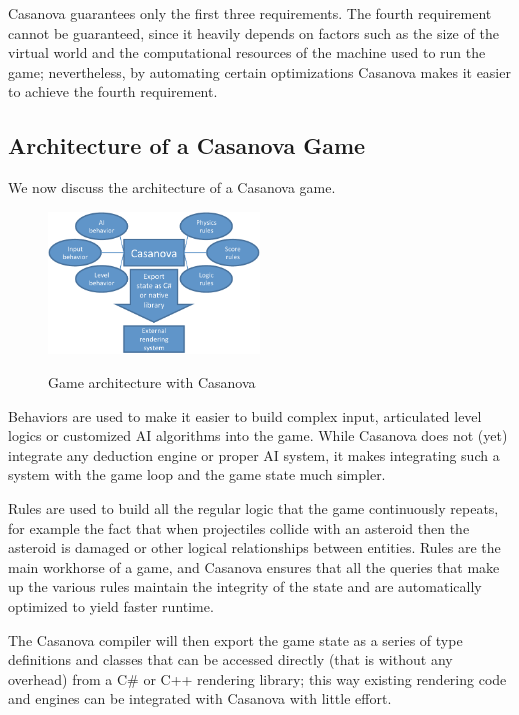 Casanova guarantees only the first three requirements. The fourth requirement cannot be guaranteed, since it heavily depends on factors such as the size of the virtual world and the computational resources of the machine used to run the game; nevertheless, by automating certain optimizations Casanova makes it easier to achieve the fourth requirement.



\subsection{Architecture of a Casanova Game}

We now discuss the architecture of a Casanova game.

\begin{figure}
\centering
\includegraphics[width=0.5\textwidth]{architecture.pdf}
\caption{Game architecture with Casanova}
\noindent
\label{test}
\end{figure}

Behaviors are used to make it easier to build complex input, articulated level logics or customized AI algorithms into the game. While Casanova does not (yet) integrate any deduction engine or proper AI system, it makes integrating such a system with the game loop and the game state much simpler.

Rules are used to build all the regular logic that the game continuously repeats, for example the fact that when projectiles collide with an asteroid then the asteroid is damaged or other logical relationships between entities. Rules are the main workhorse of a game, and Casanova ensures that all the queries that make up the various rules maintain the integrity of the state and are automatically optimized to yield faster runtime.

The Casanova compiler will then export the game state as a series of type definitions and classes that can be accessed directly (that is without any overhead) from a C\# or C++ rendering library; this way existing rendering code and engines can be integrated with Casanova with little effort.
